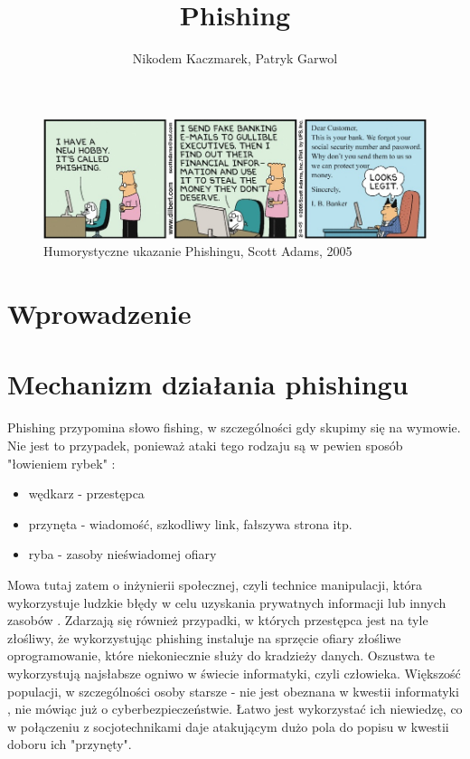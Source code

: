 \documentclass[]{article}
\title{Phishing}
\author{Nikodem Kaczmarek, Patryk Garwol}
\begin{document}
\maketitle
\begin{figure}[h!]
	\centering
	\includegraphics[width=\linewidth]{Pictures/phishing_comics.jpg}
	\caption{Humorystyczne ukazanie Phishingu, Scott Adams, 2005}
	\label{fig:pp_phishing2019}
\end{figure}


\newpage 

\section{Wprowadzenie}




\newpage
\section{Mechanizm działania phishingu}

Phishing przypomina słowo fishing, w szczególności gdy skupimy się na wymowie. Nie jest to przypadek, ponieważ ataki tego rodzaju są w pewien sposób "łowieniem rybek" \cite{govpl_phishing}:
\begin{itemize}[label=$\rightarrow$]
	\item wędkarz - przestępca
	\item przynęta - wiadomość, szkodliwy link, fałszywa strona itp.
	\item ryba - zasoby nieświadomej ofiary
\end{itemize} 

Mowa tutaj zatem o inżynierii społecznej, czyli technice manipulacji, która wykorzystuje ludzkie błędy w celu uzyskania prywatnych informacji lub innych zasobów \cite{kaspersky_social_engineering}.
Zdarzają się również przypadki, w których przestępca jest na tyle złośliwy, że wykorzystując phishing instaluje na sprzęcie ofiary złośliwe oprogramowanie, które niekoniecznie służy do kradzieży danych. Oszustwa te wykorzystują najsłabsze ogniwo w świecie informatyki, czyli człowieka. Większość populacji, w szczególności osoby starsze - nie jest obeznana w kwestii informatyki \cite{dsgi_wiley}, nie mówiąc już o cyberbezpieczeństwie. Łatwo jest wykorzystać ich niewiedzę, co w połączeniu z socjotechnikami daje atakującym dużo pola do popisu w kwestii doboru ich "przynęty".
\end{document}
